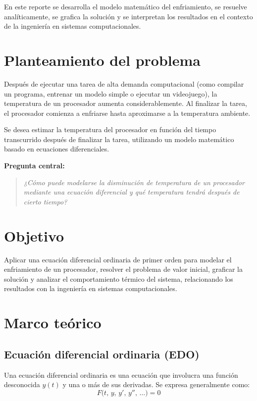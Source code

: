 \documentclass[12pt,a4paper]{article}
\begin{document}
En este reporte se desarrolla el modelo matemático del enfriamiento, se resuelve analíticamente, se grafica la solución y se interpretan los resultados en el contexto de la ingeniería en sistemas computacionales.

\section{Planteamiento del problema}

Después de ejecutar una tarea de alta demanda computacional (como compilar un programa, entrenar un modelo simple o ejecutar un videojuego), la temperatura de un procesador aumenta considerablemente. Al finalizar la tarea, el procesador comienza a enfriarse hasta aproximarse a la temperatura ambiente.

Se desea estimar la temperatura del procesador en función del tiempo transcurrido después de finalizar la tarea, utilizando un modelo matemático basado en ecuaciones diferenciales.

\textbf{Pregunta central:}
\begin{quote}
\itshape ¿Cómo puede modelarse la disminución de temperatura de un procesador mediante una ecuación diferencial y qué temperatura tendrá después de cierto tiempo?
\end{quote}

\section{Objetivo}

Aplicar una ecuación diferencial ordinaria de primer orden para modelar el enfriamiento de un procesador, resolver el problema de valor inicial, graficar la solución y analizar el comportamiento térmico del sistema, relacionando los resultados con la ingeniería en sistemas computacionales.

\section{Marco teórico}

\subsection{Ecuación diferencial ordinaria (EDO)}

Una ecuación diferencial ordinaria es una ecuación que involucra una función desconocida \(y(t)\) y una o más de sus derivadas. Se expresa generalmente como:
\[
F\bigl(t,\,y,\,y',\,y'',\,\dots\bigr)=0
\]
\end{document}
